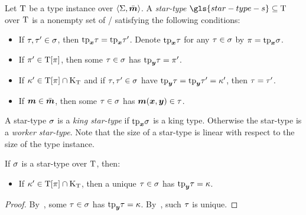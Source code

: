 \begin{definition}\label{def:star-type}
Let $\mathrm{T}$ be a type instance over $\left\langle \mathrm{\Sigma},\bar{\bm{m}} \right\rangle$.
A \emph{star-type} $\gls{star-type-s} \subseteq \TI$ over $\mathrm{T}$ is a
nonempty set of \twotypes/ satisfying the following conditions:
\begin{itemize}
  \item[\condstpx]\label{cond:stpx}
  If $\tau, {\tau'} \in \sigma$, then $\mathrm{tp}_{\bm{x}}\tau = \mathrm{tp}_{\bm{x}}{\tau'}$.
  Denote $\mathrm{tp}_{\bm{x}}\tau$ for any $\tau \in \sigma$ by $\pi=\mathrm{tp}_{\bm{x}}\sigma$.
  
  \item[\condstppy]\label{cond:stppy}
  If ${\pi'} \in \mathrm{T}[\pi]$, then some $\tau\in\sigma$ has
  $\mathrm{tp}_{\bm{y}}\tau = {\pi'}$.
  
  \item[\condstpky]\label{cond:stpky}
  If ${\kappa'} \in \mathrm{T}[\pi]\cap{\mathrm{K}}_{\mathrm{T}}$
  and if $\tau,{\tau'} \in \sigma$ have $\mathrm{tp}_{\bm{y}}\tau = \mathrm{tp}_{\bm{y}}{\tau'} = {\kappa'}$,
  then $\tau = {\tau'}$.
  
  \item[\condstpm]\label{cond:stpm}
  If $\bm{m} \in \bar{\bm{m}}$, then some $\tau\in\sigma$ has $\bm{m}(\bm{x},\bm{y}) \in \tau$.
\end{itemize}
\end{definition}
A star-type $\sigma$ is a \emph{king star-type} if $\mathrm{tp}_{\bm{x}}\sigma$ is a king type.
Otherwise the star-type is a \emph{worker star-type}.
Note that the size of a star-type is linear with respect to the size of the type
instance.
\begin{remark}
If $\sigma$ is a star-type over $\mathrm{T}$, then:
\begin{itemize}
  \item[\condstpkyu]\label{cond:stpkyu}
  If ${\kappa'} \in \mathrm{T}[\pi]\cap{\mathrm{K}}_{\mathrm{T}}$,
  then a unique $\tau\in\sigma$ has $\mathrm{tp}_{\bm{y}}\tau = \kappa$.
\end{itemize}
\end{remark}
\begin{proof}
By~, some $\tau\in\sigma$ has $\mathrm{tp}_{\bm{y}}\tau = \kappa$.
By~, such $\tau$ is unique.
\end{proof}

